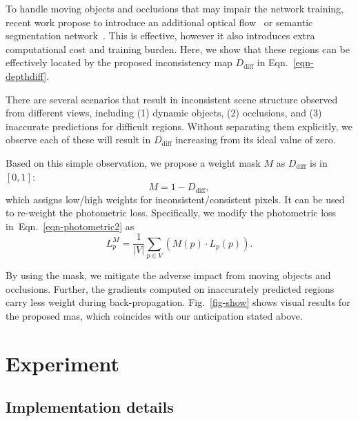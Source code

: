 \documentclass{article}
\newcommand{\figref}[1]{Fig.~\ref{#1}}
\newcommand{\equref}[1]{Eqn.~\ref{#1}}
\begin{document}
To handle moving objects and occlusions that may impair the network training,
recent work propose to introduce an additional optical flow~\cite{yin2018geonet,zou2018df,ranjan2019cc} or semantic segmentation network~\cite{jiao2018look}.
This is effective, however it also introduces extra computational cost and training burden.
Here, we show that these regions can be effectively located by the proposed inconsistency map $D_{\text{diff}}$ in \equref{eqn-depthdiff}.

There are several scenarios that result in inconsistent scene structure observed from different views, including (1) dynamic objects, (2) occlusions, and (3) inaccurate predictions for difficult regions.
Without separating them explicitly, we observe each of these will result in $D_{\text{diff}}$ increasing from its ideal value of zero.

Based on this simple observation, we propose a weight mask $M$ as $D_{\text{diff}}$ is in $[0, 1]$:
\begin{equation}\label{eqn-mask}
M = 1 - D_{\text{diff}},
\end{equation}
which assigns low/high weights for inconsistent/consistent pixels. It can be used to re-weight the photometric loss.
Specifically, we modify the photometric loss in~\equref{eqn-photometric2} as
\begin{equation}
L_{p}^M = \frac{1}{|V|} \sum_{p \in V} (M(p) \cdot L_{p} (p)) \label{eqn-maskedphotometricloss}.
\end{equation}


By using the mask, we mitigate the adverse impact from moving objects and occlusions.
Further, the gradients computed on inaccurately predicted regions carry less weight during back-propagation.
\figref{fig-show} shows visual results for the proposed mas, which coincides with our anticipation stated above.



\section{Experiment}
\subsection{Implementation details}\label{sec-details}
\end{document}
